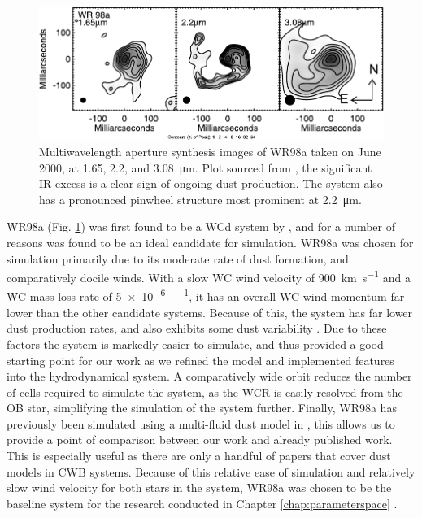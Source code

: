 \begin{figure}[h]
  \centering
  \includegraphics{assets/systems/wr98a-monnier2007.pdf}
  \caption[\textit{Multiwavelength image of WR98a \parencite{monnierKeckAperturemaskingExperiment2007}}]{Multiwavelength aperture synthesis images of WR98a taken on June  2000, at 1.65, 2.2, and \SI{3.08}{\micro\metre}. Plot sourced from \textcite{monnierKeckAperturemaskingExperiment2007}, the significant IR excess is a clear sign of ongoing dust production. The system also has a pronounced pinwheel structure most prominent at \SI{2.2}{\micro\metre}.}
  \label{fig:wr98aimage}
\end{figure}


WR98a (Fig. \ref{fig:wr98aimage}) was first found to be a WCd system by \textcite{monnierPinwheelNebulaWR1999}, and for a number of reasons was found to be an ideal candidate for simulation.
WR98a was chosen for simulation primarily due to its moderate rate of dust formation, and comparatively docile winds.
With a slow WC wind velocity of \SI{900}{\kilo\metre\per\second} and a WC mass loss rate of \SI{5e-6}{\solarmass\per\year}, it has an overall WC wind momentum far lower than the other candidate systems.
Because of this, the system has far lower dust production rates, and also exhibits some dust variability \parencite{lauRevisitingImpactDust2020}.
Due to these factors the system is markedly easier to simulate, and thus provided a good starting point for our work as we refined the model and implemented features into the hydrodynamical system.
A comparatively wide orbit reduces the number of cells required to simulate the system, as the WCR is easily resolved from the OB star, simplifying the simulation of the system further.
Finally, WR98a has previously been simulated using a multi-fluid dust model in \textcite{hendrix_pinwheels_2016}, this allows us to provide a point of comparison between our work and already published work.
This is especially useful as there are only a handful of papers that cover dust models in CWB systems.
Because of this relative ease of simulation and relatively slow wind velocity for both stars in the system, WR98a was chosen to be the baseline system for the research conducted in Chapter \ref{chap:parameterspace} \parencite{eatsonExplorationDustGrain2022}.


